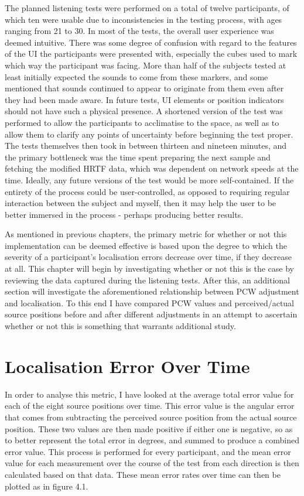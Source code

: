 The planned listening tests were performed on a total of twelve participants, of which ten were usable due to inconsistencies in the testing process, with ages ranging from 21 to 30. In most of the tests, the overall user experience was deemed intuitive. There was some degree of confusion with regard to the features of the UI the participants were presented with, especially the cubes used to mark which way the participant was facing. More than half of the subjects tested at least initially expected the sounds to come from these markers, and some mentioned that sounds continued to appear to originate from them even after they had been made aware. In future tests, UI elements or position indicators should not have such a physical presence. A shortened version of the test was performed to allow the participants to acclimatise to the space, as well as to allow them to clarify any points of uncertainty before beginning the test proper. The tests themselves then took in between thirteen and nineteen minutes, and the primary bottleneck was the time spent preparing the next sample and fetching the modified HRTF data, which was dependent on network speeds at the time. Ideally, any future versions of the test would be more self-contained. If the entirety of the process could be user-controlled, as opposed to requiring regular interaction between the subject and myself, then it may help the user to be better immersed in the process - perhaps producing better results. 

As mentioned in previous chapters, the primary metric for whether or not this implementation can be deemed effective is based upon the degree to which the severity of a participant's localisation errors decrease over time, if they decrease at all. This chapter will begin by investigating whether or not this is the case by reviewing the data captured during the listening tests. After this, an additional section will investigate the aforementioned relationship between PCW adjustment and localisation. To this end I have compared PCW values and perceived/actual source positions before and after different adjustments in an attempt to ascertain whether or not this is something that warrants additional study.	

\section{Localisation Error Over Time}
In order to analyse this metric, I have looked at the average total error value for each of the eight source positions over time. This error value is the angular error that comes from subtracting the perceived source position from the actual source position. These two values are then made positive if either one is negative, so as to better represent the total error in degrees, and summed to produce a combined error value. This process is performed for every participant, and the mean error value for each measurement over the course of the test from each direction is then calculated based on that data. These mean error rates over time can then be plotted as in figure 4.1. 

